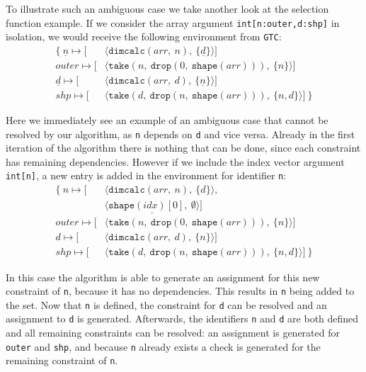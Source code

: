 To illustrate such an ambiguous case we take another look at the selection function example.
If we consider the array argument \texttt{int[n:outer,d:shp]} in isolation, we would receive the following environment \cenv{} from \texttt{GTC}:
\begin{align*}
    \mathbf{\{}\ 
        \underline{n} \mapsto [&\langle\texttt{dimcalc}(arr,\ n),\ \{\underline{d}\}\rangle] \\
        outer         \mapsto [&\langle\texttt{take}(n,\ \texttt{drop}(0,\ \texttt{shape}(arr))),\ \{n\}\rangle] \\
        \underline{d} \mapsto [&\langle\texttt{dimcalc}(arr,\ d),\ \{\underline{n}\}\rangle] \\
        shp           \mapsto [&\langle\texttt{take}(d,\ \texttt{drop}(n,\ \texttt{shape}(arr))),\ \{n,d\}\rangle]
    \ \mathbf{\}}
\end{align*}

\noindent
Here we immediately see an example of an ambiguous case that cannot be resolved by our algorithm, as \texttt{n} depends on \texttt{d} and vice versa.
Already in the first iteration of the algorithm there is nothing that can be done, since each constraint has remaining dependencies.
However if we include the index vector argument \texttt{int[n]}, a new entry is added in the environment for identifier \texttt{n}:
\begin{align*}
    \mathbf{\{}\ 
        n     \mapsto [&\langle\texttt{dimcalc}(arr,\ n),\ \{d\}\rangle, \\
            &\underline{\langle\texttt{shape}(idx)[0],\ \emptyset\rangle}] \\
        outer \mapsto [&\langle\texttt{take}(n,\ \texttt{drop}(0,\ \texttt{shape}(arr))),\ \{n\}\rangle] \\
        d     \mapsto [&\langle\texttt{dimcalc}(arr,\ d),\ \{n\}\rangle] \\
        shp   \mapsto [&\langle\texttt{take}(d,\ \texttt{drop}(n,\ \texttt{shape}(arr))),\ \{n,d\}\rangle]
    \ \mathbf{\}}
\end{align*}

\noindent
In this case the algorithm is able to generate an assignment for this new constraint of \texttt{n}, because it has no dependencies.
This results in \texttt{n} being added to the  set.
Now that \texttt{n} is defined, the constraint for \texttt{d} can be resolved and an assignment to \texttt{d} is generated.
Afterwards, the identifiers \texttt{n} and \texttt{d} are both defined and all remaining constraints can be resolved: an assignment is generated for \texttt{outer} and \texttt{shp}, and because \texttt{n} already exists a check is generated for the remaining constraint of \texttt{n}.
